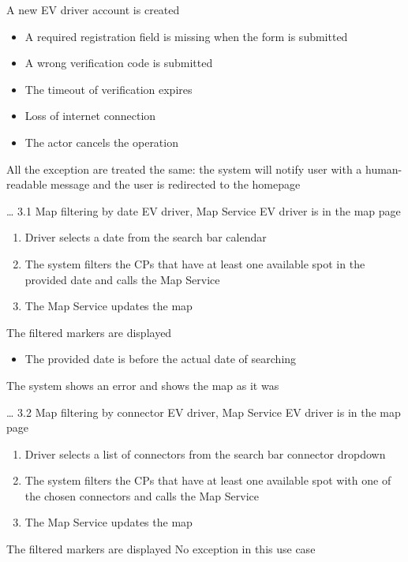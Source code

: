{A new EV driver account is created}
{
    \begin{itemize}
        \item A required registration field is missing when the form is submitted
        \item A wrong verification code is submitted
        \item The timeout of verification expires
        \item Loss of internet connection
        \item The actor cancels the operation
    \end{itemize}
}
{
    All the exception are treated the same: the system will notify user with a human-readable message and the user is redirected to the homepage
}


\usecase
{
    \dots %
}
{3.1}
{Map filtering by date}
{EV driver, Map Service}
{EV driver is in the map page}
{
    \begin{enumerate}
        \item Driver selects a date from the search bar calendar
        \item The system filters the CPs that have at least one available spot in the provided date and calls the Map Service
        \item The Map Service updates the map
    \end{enumerate}
}
{The filtered markers are displayed}
{
    \begin{itemize}
        \item The provided date is before the actual date of searching
    \end{itemize}
}
{
    The system shows an error and shows the map as it was
}

\usecase
{
    \dots %
}
{3.2}
{Map filtering by connector}
{EV driver, Map Service}
{EV driver is in the map page}
{
    \begin{enumerate}
        \item Driver selects a list of connectors from the search bar connector dropdown
        \item The system filters the CPs that have at least one available spot with one of the chosen connectors and calls the Map Service
        \item The Map Service updates the map
    \end{enumerate}
}
{The filtered markers are displayed}
{
    No exception in this use case
}
{
}

